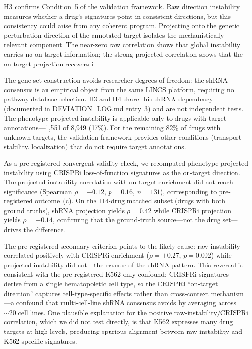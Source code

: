 \documentclass[11pt]{article}
\begin{document}
H3 confirms Condition~5 of the validation framework. Raw direction instability
measures whether a drug's signatures point in consistent directions, but
this consistency could arise from any coherent program. Projecting onto the
genetic perturbation direction of the annotated target isolates the
mechanistically relevant component. The near-zero raw correlation shows
that global instability carries no on-target information; the strong
projected correlation shows that the on-target projection recovers it.

The gene-set construction avoids researcher degrees of freedom: the shRNA
consensus is an empirical object from the same LINCS platform,
requiring no pathway database selection. H3 and H4 share this shRNA
dependency (documented in DEVIATION\_LOG.md entry~3) and are not
independent tests. The phenotype-projected instability is applicable only
to drugs with target annotations---1{,}551 of 8{,}949 (17\%). For the
remaining 82\% of drugs with unknown targets, the validation framework
provides other conditions (transport stability, localization) that do not
require target annotations.

As a pre-registered convergent-validity check, we recomputed
phenotype-projected instability using CRISPRi loss-of-function signatures
\citep{replogle2022mapping} as the on-target
direction. The projected-instability correlation with on-target enrichment
did not reach significance (Spearman $\rho = -0.12$, $p = 0.16$,
$n = 131$), corresponding to pre-registered outcome~(c). On the
114-drug matched subset (drugs with both ground truths), shRNA
projection yields $\rho = 0.42$ while CRISPRi projection yields
$\rho = -0.14$, confirming that the ground-truth source---not the
drug set---drives the difference.

The pre-registered secondary criterion points to the likely cause: raw
instability correlated positively with CRISPRi enrichment
($\rho = +0.27$, $p = 0.002$) while projected instability did not---the
reverse of the shRNA pattern. This reversal is consistent with the
pre-registered K562-only confound: CRISPRi signatures derive from a
single hematopoietic cell type, so the CRISPRi ``on-target direction''
captures cell-type-specific effects rather than cross-context
mechanism---a confound that multi-cell-line shRNA consensus avoids by
averaging across ${\sim}20$ cell lines. One plausible explanation for
the positive raw-instability/CRISPRi correlation, which we did not test
directly, is that K562 expresses many drug targets at high levels,
producing spurious alignment between raw instability and K562-specific
signatures.
\end{document}

